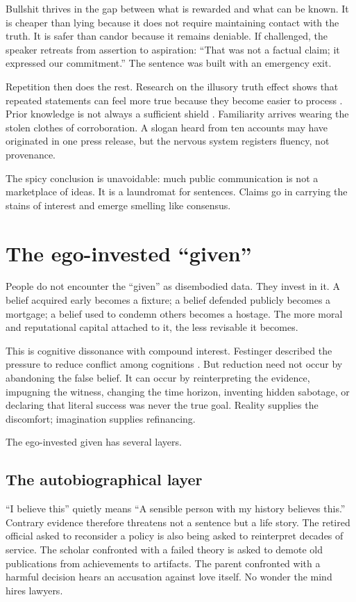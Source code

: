 ﻿\documentclass[12pt,a4paper]{book}
\begin{document}
Bullshit thrives in the gap between what is rewarded and what can be known. It is cheaper than lying because it does not require maintaining contact with the truth. It is safer than candor because it remains deniable. If challenged, the speaker retreats from assertion to aspiration: “That was not a factual claim; it expressed our commitment.” The sentence was built with an emergency exit.

Repetition then does the rest. Research on the illusory truth effect shows that repeated statements can feel more true because they become easier to process \cite{HasherGoldsteinToppino1977}. Prior knowledge is not always a sufficient shield \cite{FazioEtAl2015}. Familiarity arrives wearing the stolen clothes of corroboration. A slogan heard from ten accounts may have originated in one press release, but the nervous system registers fluency, not provenance.

The spicy conclusion is unavoidable: much public communication is not a marketplace of ideas. It is a laundromat for sentences. Claims go in carrying the stains of interest and emerge smelling like consensus.

\section{The ego-invested “given”}

People do not encounter the “given” as disembodied data. They invest in it. A belief acquired early becomes a fixture; a belief defended publicly becomes a mortgage; a belief used to condemn others becomes a hostage. The more moral and reputational capital attached to it, the less revisable it becomes.

This is cognitive dissonance with compound interest. Festinger described the pressure to reduce conflict among cognitions \cite{Festinger1957}. But reduction need not occur by abandoning the false belief. It can occur by reinterpreting the evidence, impugning the witness, changing the time horizon, inventing hidden sabotage, or declaring that literal success was never the true goal. Reality supplies the discomfort; imagination supplies refinancing.

The ego-invested given has several layers.

\subsection{The autobiographical layer}

“I believe this” quietly means “A sensible person with my history believes this.” Contrary evidence therefore threatens not a sentence but a life story. The retired official asked to reconsider a policy is also being asked to reinterpret decades of service. The scholar confronted with a failed theory is asked to demote old publications from achievements to artifacts. The parent confronted with a harmful decision hears an accusation against love itself. No wonder the mind hires lawyers.
\end{document}
